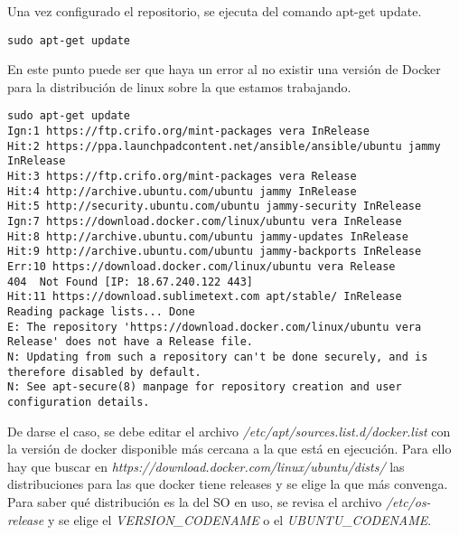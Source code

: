 \documentclass[../main.tex]{subfiles}
\begin{document}
Una vez configurado el repositorio, se ejecuta del comando apt-get update.
\begin{lstlisting}
sudo apt-get update
\end{lstlisting}
En este punto puede ser que haya un error al no existir una versión de Docker para la distribución de linux sobre la que estamos trabajando.

\begin{lstlisting}
sudo apt-get update 
Ign:1 https://ftp.crifo.org/mint-packages vera InRelease
Hit:2 https://ppa.launchpadcontent.net/ansible/ansible/ubuntu jammy InRelease  
Hit:3 https://ftp.crifo.org/mint-packages vera Release                         
Hit:4 http://archive.ubuntu.com/ubuntu jammy InRelease                         
Hit:5 http://security.ubuntu.com/ubuntu jammy-security InRelease               
Ign:7 https://download.docker.com/linux/ubuntu vera InRelease                  
Hit:8 http://archive.ubuntu.com/ubuntu jammy-updates InRelease                 
Hit:9 http://archive.ubuntu.com/ubuntu jammy-backports InRelease               
Err:10 https://download.docker.com/linux/ubuntu vera Release                   
404  Not Found [IP: 18.67.240.122 443]
Hit:11 https://download.sublimetext.com apt/stable/ InRelease
Reading package lists... Done
E: The repository 'https://download.docker.com/linux/ubuntu vera Release' does not have a Release file.
N: Updating from such a repository can't be done securely, and is therefore disabled by default.
N: See apt-secure(8) manpage for repository creation and user configuration details.
\end{lstlisting}

De darse el caso, se debe editar el archivo \textit{/etc/apt/sources.list.d/docker.list} con la versión de docker disponible más cercana a la que está en ejecución. Para ello hay que buscar en \textit{https://download.docker.com/linux/ubuntu/dists/} las distribuciones para las que docker tiene releases y se elige la que más convenga. Para saber qué distribución es la del SO en uso, se revisa el archivo \textit{/etc/os-release} y se elige el \textit{VERSION\_CODENAME} o el 
 \textit{UBUNTU\_CODENAME}.
 
\end{document}

